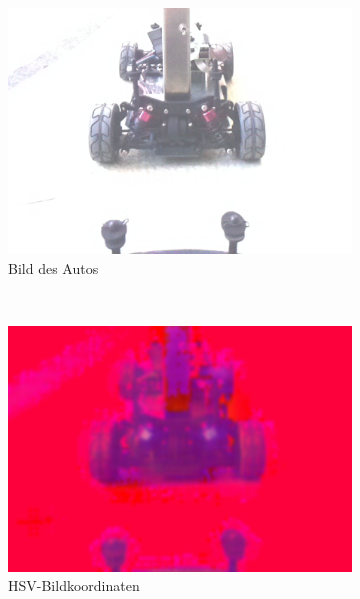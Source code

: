 \documentclass[10pt]{article}
\begin{document}
    \begin{figure}[htbp]
        \centering
        \begin{subfigure}[b]{0.3\textwidth}
            \includegraphics[width=\textwidth]{crob_image}
            \caption{Bild des Autos}\label{fig:car}
        \end{subfigure}~\begin{subfigure}[b]{0.3\textwidth}
            \includegraphics[width=\textwidth]{crob_image_hsv}
            \caption{HSV-Bildkoordinaten}\label{fig:car_hcsv}
        \end{subfigure}~\begin{subfigure}[b]{0.3\textwidth}

\end{subfigure}
\end{figure}
\end{document}
